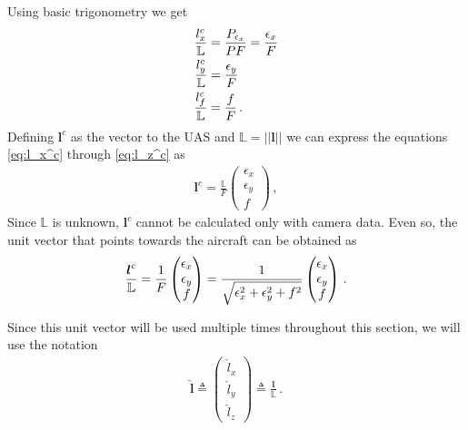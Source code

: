 Using basic trigonometry we get
\begin{align}
\frac{l_x^c}{\mathbb{L}}&=\frac{P_{\epsilon_x}}{PF}=\frac{\epsilon_x}{F}{\label{eq:l_x^c}}\\
\frac{l_y^c}{\mathbb{L}}&=\frac{\epsilon_y}{F}{\label{eq:l_y^c}} \\
\frac{l_f^c}{\mathbb{L}}&=\frac{f}{F}{\label{eq:l_z^c}}\,.
\end{align}
Defining $\boldsymbol{l}^c$ as the vector to the UAS and $\mathbb{L}=\lvert\lvert \boldsymbol{l}\rvert\rvert$ we can express the equations \ref{eq:l_x^c} through \ref{eq:l_z^c} as
\begin{align}
\boldsymbol{l}^c=\frac{\mathbb{L}}{F}
\begin{pmatrix}
\epsilon_x \\
\epsilon_y \\
f
\end{pmatrix}\,,
\end{align}
Since $\mathbb{L}$ is unknown, $\boldsymbol{l}^c$ cannot be calculated only with camera data. Even so, the unit vector that points towards the aircraft can be obtained as
\begin{align}{\label{eq:norm_line_of_sight_vector}}
\frac{\boldsymbol{l}^c}{\mathbb{L}}=\frac{1}{F}
\begin{pmatrix}
\epsilon_x \\
\epsilon_y \\
f
\end{pmatrix} =
\frac{1}{\sqrt{\epsilon_x^2+\epsilon_y^2+f^2}}
\begin{pmatrix}
\epsilon_x \\
\epsilon_y \\
f
\end{pmatrix}\,.
\end{align}

Since this unit vector will be used multiple times throughout this section, we will use the notation
\begin{align*}
\check{\boldsymbol{l}}\triangleq
\begin{pmatrix}
\check{l}_x \\
\check{l}_y \\
\check{l}_z
\end{pmatrix} \triangleq
\frac{\boldsymbol{l}}{\mathbb{L}}\,.
\end{align*}
\pagebreak
